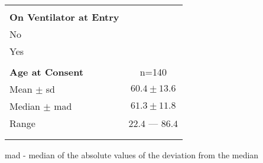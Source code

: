\documentclass[dvips, 10pt]{article}
\begin{document}
\begin{table}[tbp]
\begin{center}
\begin{tabular}{ @{}l@{}
@{}c@{}
}
 \vspace{0em} \\
\parbox[b]{ 70mm }{\raggedright{{\bf On Ventilator at Entry }}} &
  \\
 \hspace{1em} No &
  \\
 \hspace{1em} Yes &
  \\
 \vspace{0em} \\
\parbox[b]{ 70mm }{\raggedright{{\bf Age at Consent }}} &
 n=140 \\
 \hspace{1em} Mean $\pm$ sd &
 $ 60.4 \pm 13.6 $ \\
 \hspace{1em} Median $\pm$ mad &
 $ 61.3 \pm 11.8 $ \\
 \hspace{1em} Range &
 $ 22.4 $ --- $ 86.4 $ \\
 \vspace{0em} \\
\hline \\ 
\end{tabular}

\parbox{ 5in }{ mad - median of the absolute values of the deviation from the median } \\
 \vspace{1em}\end{center}
 \end{table}
\clearpage
\end{document}
